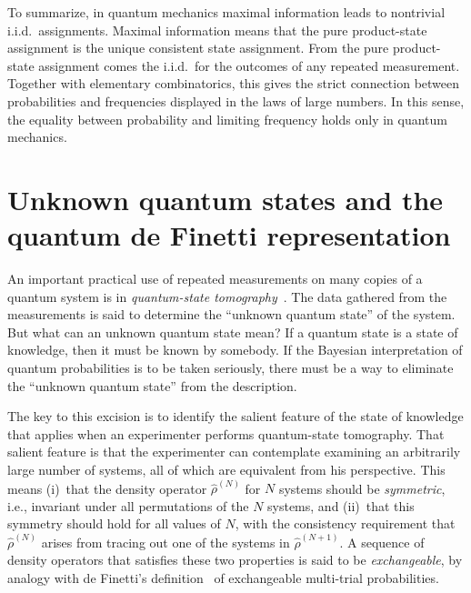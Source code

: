 \documentclass[aps,12pt]{revtex4}
\begin{document}
To summarize, in quantum mechanics maximal information leads to
nontrivial i.i.d.\ assignments.  Maximal information means that the
pure product-state assignment is the unique consistent state
assignment.  From the pure product-state assignment comes the i.i.d.\
for the outcomes of any repeated measurement.  Together with
elementary combinatorics, this gives the strict connection between
probabilities and frequencies displayed in the laws of large numbers.
In this sense, the equality between probability and limiting
frequency holds only in quantum mechanics.

\section{Unknown quantum states and the quantum de Finetti
representation}

An important practical use of repeated measurements on many copies
of a quantum system is in {\it quantum-state
tomography\/}~\cite{Leonhardt,Buzek98}.  The data gathered from the
measurements is said to determine the ``unknown quantum state'' of
the system. But what can an unknown quantum state mean?  If a quantum
state is a state of knowledge, then it must be known by somebody.  If
the Bayesian interpretation of quantum probabilities is to be taken
seriously, there must be a way to eliminate the ``unknown quantum
state'' from the description.

The key to this excision is to identify the salient feature of the
state of knowledge that applies when an experimenter performs
quantum-state tomography.  That salient feature is that the
experimenter can contemplate examining an arbitrarily large number of
systems, all of which are equivalent from his perspective.  This
means (i)~that the density operator $\hat\rho^{(N)}$ for $N$ systems
should be {\it symmetric}, i.e., invariant under all permutations of
the $N$ systems, and (ii)~that this symmetry should hold for all
values of $N$, with the consistency requirement that
$\hat\rho^{(N)}$ arises from tracing out one of the systems in
$\hat\rho^{(N+1)}$.  A sequence of density operators that satisfies
these two properties is said to be {\it exchangeable}, by analogy
with de Finetti's definition~\cite{DeFinettiBook} of exchangeable
multi-trial probabilities.
\end{document}
